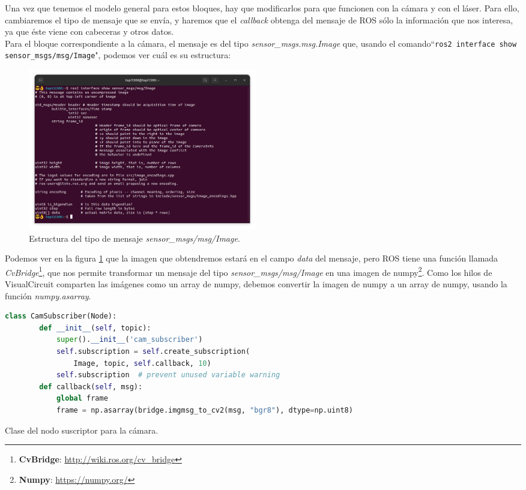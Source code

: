 Una vez que tenemos el modelo general para estos bloques, hay que modificarlos para que funcionen con la cámara y con el láser. Para ello,
cambiaremos el tipo de mensaje que se envía, y haremos que el \textit{callback} obtenga del mensaje de ROS sólo la información que nos interesa,
ya que éste viene con cabeceras y otros datos.\\

Para el bloque correspondiente a la cámara, el mensaje es del tipo \textit{sensor\_msgs.msg.Image} que, usando el comando``\lstinline|ros2 interface show sensor_msgs/msg/Image|",
podemos ver cuál es su estructura:
\begin{figure} [H]
  \begin{center}
      \includegraphics[width=10cm]{figs/c4/image_struct.png}
  \end{center}
  \caption[Estructura mensaje Image]{Estructura del tipo de mensaje \textit{sensor\_msgs/msg/Image}.}
  \label{fig:image_struct}
\end{figure}
Podemos ver en la figura \ref{fig:image_struct} que la imagen que obtendremos estará en el campo \textit{data} del mensaje, pero ROS tiene una
función llamada \textit{CvBridge}\footnote{\textbf{CvBridge}: \url{http://wiki.ros.org/cv_bridge}}, que nos permite transformar un mensaje del
tipo \textit{sensor\_msgs/msg/Image} en una imagen de numpy\footnote{\textbf{Numpy}: \url{https://numpy.org/}}. Como los hilos de VisualCircuit
comparten las imágenes como un array de numpy, debemos convertir la imagen de numpy a un array de numpy, usando la función \textit{numpy.asarray}.
\begin{code}[H]
  \begin{lstlisting}[language=python]
    class CamSubscriber(Node):
        def __init__(self, topic):
            super().__init__('cam_subscriber')
            self.subscription = self.create_subscription(
                Image, topic, self.callback, 10)
            self.subscription  # prevent unused variable warning
        def callback(self, msg):
            global frame
            frame = np.asarray(bridge.imgmsg_to_cv2(msg, "bgr8"), dtype=np.uint8)
  \end{lstlisting}
  \caption[Clase del nodo suscriptor para cámara]{Clase del nodo suscriptor para la cámara.}
  \label{cod:cam_node_class}
\end{code}
